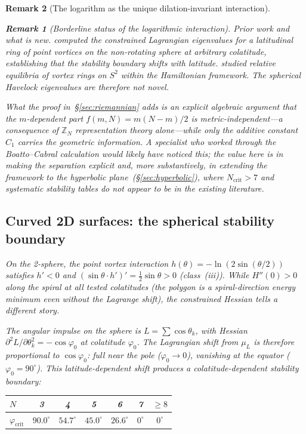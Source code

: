 \documentclass[12pt, a4paper]{article}
\newtheorem{remark}{Remark}[section]
\numberwithin{equation}{section}
\begin{document}
\begin{remark}[The logarithm as the unique dilation-invariant interaction]
\begin{remark}[Borderline status of the logarithmic interaction]
\noindent\emph{Prior work and what is new.}
\citet{BoattoCabral2003} computed the constrained Lagrangian eigenvalues
for a latitudinal ring of point vortices on the non-rotating sphere at
arbitrary colatitude, establishing that the stability boundary shifts
with latitude.  \citet{LimMontaldiRoberts2001} studied relative
equilibria of vortex rings on $S^2$ within the Hamiltonian framework.
The spherical Havelock eigenvalues are therefore not novel.

What the proof in~\S\ref{sec:riemannian} adds is an explicit algebraic
argument that the $m$-dependent part $f(m,N) = m(N{-}m)/2$ is
\emph{metric-independent}---a consequence of $\mathbb{Z}_N$
representation theory alone---while only the additive constant $C_1$
carries the geometric information.  A specialist who worked through the
Boatto--Cabral calculation would likely have noticed this; the value
here is in making the separation explicit and, more substantively, in
extending the framework to the hyperbolic plane~(\S\ref{sec:hyperbolic}),
where $N_{\mathrm{crit}} > 7$ and systematic stability tables do not
appear to be in the existing literature.

\subsection{Curved 2D surfaces: the spherical stability boundary}
\label{sec:curved}

On the 2-sphere, the point vortex interaction
$h(\theta) = -\ln(2\sin(\theta/2))$ satisfies $h' < 0$ and
$(\sin\theta\cdot h')' = \tfrac12\sin\theta > 0$ (class~(iii)).
While $H''(0) > 0$ along the spiral at all tested colatitudes
(the polygon is a spiral-direction energy minimum even without
the Lagrange shift), the \emph{constrained} Hessian tells a
different story.

The angular impulse on the sphere is
$L = \sum\cos\theta_k$, with Hessian
$\partial^2 L/\partial\theta_k^2 = -\cos\varphi_0$ at colatitude
$\varphi_0$.  The Lagrangian shift from $\mu_L$ is therefore
proportional to $\cos\varphi_0$: full near the pole ($\varphi_0 \to 0$),
vanishing at the equator ($\varphi_0 = 90^\circ$).  This
latitude-dependent shift produces a \emph{colatitude-dependent
stability boundary}:

\begin{center}
\begin{tabular}{lcccccc}
\toprule
$N$ & 3 & 4 & 5 & 6 & 7 & $\ge 8$ \\
\midrule
$\varphi_{\mathrm{crit}}$ & $90.0^\circ$ & $54.7^\circ$ &
  $45.0^\circ$ & $26.6^\circ$ & $0^\circ$ & $0^\circ$ \\
\bottomrule
\end{tabular}
\end{center}


\end{remark}
\end{remark}
\end{document}
